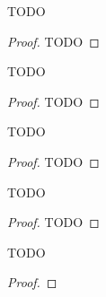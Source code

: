\begin{theorem}
  \label{bricard_condition}
  TODO
\end{theorem}
\begin{proof}
  TODO
\end{proof}

\begin{theorem}[Example 1]
  \label{example1}
  TODO
\end{theorem}
\begin{proof}
    TODO
\end{proof}

\begin{theorem}[Example 2]
  \label{example2}
  TODO
\end{theorem}
\begin{proof}
    TODO
\end{proof}

\begin{theorem}[Example 3]
  \label{example3}
  TODO
\end{theorem}
\begin{proof}
    TODO
\end{proof}

\begin{theorem}
  \label{hilberts_third}
  TODO
\end{theorem}
\begin{proof}
\end{proof}

